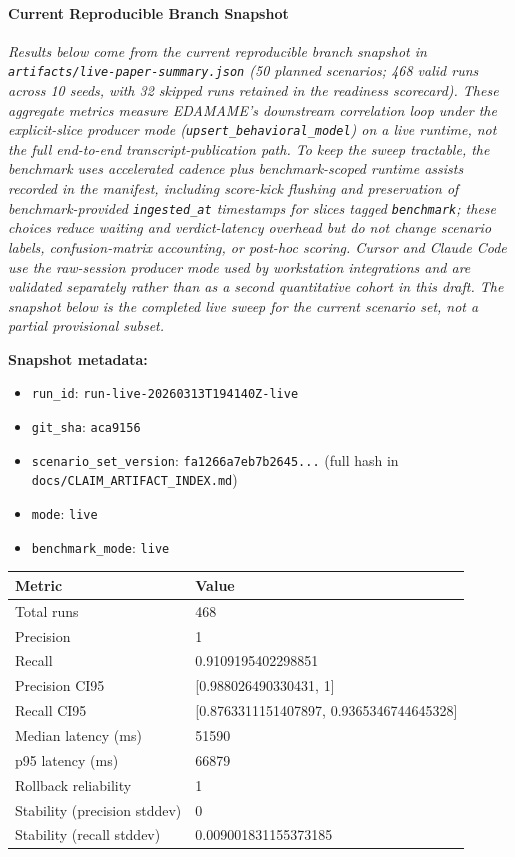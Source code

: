 \documentclass[
]{article}
\newcounter{none} %
\providecommand{\tightlist}{%
  \setlength{\itemsep}{0pt}\setlength{\parskip}{0pt}}
\begin{document}
\paragraph{Current Reproducible Branch
Snapshot}\label{current-reproducible-branch-snapshot}

\emph{Results below come from the current reproducible branch snapshot
in \texttt{artifacts/live-paper-summary.json} (50 planned scenarios; 468
valid runs across 10 seeds, with 32 skipped runs retained in the
readiness scorecard). These aggregate metrics measure EDAMAME's
downstream correlation loop under the explicit-slice producer mode
(\texttt{upsert\_behavioral\_model}) on a live runtime, not the full
end-to-end transcript-publication path. To keep the sweep tractable, the
benchmark uses accelerated cadence plus benchmark-scoped runtime assists
recorded in the manifest, including score-kick flushing and preservation
of benchmark-provided \texttt{ingested\_at} timestamps for slices tagged
\texttt{benchmark}; these choices reduce waiting and verdict-latency
overhead but do not change scenario labels, confusion-matrix accounting,
or post-hoc scoring. Cursor and Claude Code use the raw-session producer
mode used by workstation integrations and are validated separately
rather than as a second quantitative cohort in this draft. The snapshot
below is the completed live sweep for the current scenario set, not a
partial provisional subset.}

\textbf{Snapshot metadata:}

\begin{itemize}
\tightlist
\item
  \texttt{run\_id}: \texttt{run-live-20260313T194140Z-live}
\item
  \texttt{git\_sha}: \texttt{aca9156}
\item
  \texttt{scenario\_set\_version}: \texttt{fa1266a7eb7b2645...} (full
  hash in \texttt{docs/CLAIM\_ARTIFACT\_INDEX.md})
\item
  \texttt{mode}: \texttt{live}
\item
  \texttt{benchmark\_mode}: \texttt{live}
\end{itemize}

{\def\LTcaptype{none} %
\begin{longtable}[]{@{}ll@{}}
\toprule\noalign{}
Metric & Value \\
\midrule\noalign{}
\endhead
\bottomrule\noalign{}
\endlastfoot
Total runs & 468 \\
Precision & 1 \\
Recall & 0.9109195402298851 \\
Precision CI95 & {[}0.988026490330431, 1{]} \\
Recall CI95 & {[}0.8763311151407897, 0.9365346744645328{]} \\
Median latency (ms) & 51590 \\
p95 latency (ms) & 66879 \\
Rollback reliability & 1 \\
Stability (precision stddev) & 0 \\
Stability (recall stddev) & 0.009001831155373185 \\
\end{longtable}
}
\end{document}
